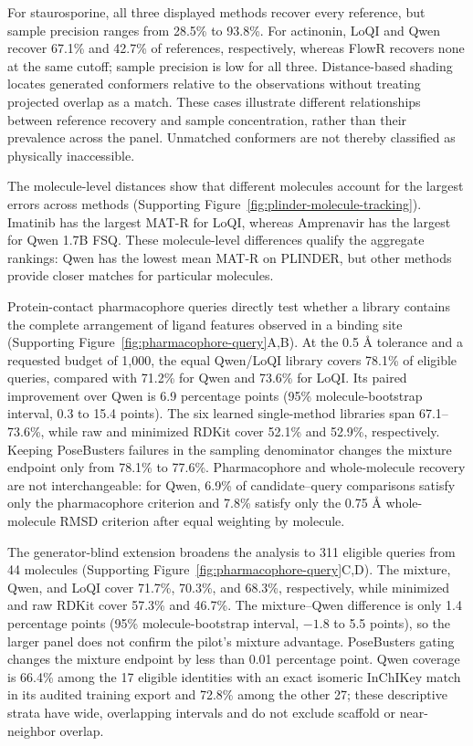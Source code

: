 For staurosporine, all three displayed methods recover every reference, but sample
precision ranges from 28.5\% to 93.8\%. For actinonin, LoQI and Qwen recover 67.1\%
and 42.7\% of references, respectively, whereas FlowR recovers none at the same cutoff;
sample precision is low for all three. Distance-based shading locates generated conformers
relative to the observations without treating projected overlap as a match. These cases
illustrate different relationships between reference recovery and sample concentration,
rather than their prevalence across the panel. Unmatched conformers are not thereby
classified as physically inaccessible.

\conformerlandscapefigure

The molecule-level distances show that different molecules account for the largest
errors across methods (Supporting Figure~\ref{fig:plinder-molecule-tracking}). Imatinib has the
largest MAT-R for LoQI, whereas Amprenavir has the largest for Qwen 1.7B FSQ.
These molecule-level differences qualify the aggregate rankings: Qwen has the lowest
mean MAT-R on PLINDER, but other methods provide closer matches for particular molecules.

Protein-contact pharmacophore queries directly test whether a library
contains the complete arrangement of ligand features observed in a binding site
(Supporting Figure~\ref{fig:pharmacophore-query}A,B). At the 0.5 \AA{} tolerance and
a requested budget of 1,000, the equal Qwen/LoQI library covers 78.1\% of eligible
queries, compared with 71.2\% for Qwen and 73.6\% for LoQI. Its paired improvement
over Qwen is 6.9 percentage points (95\% molecule-bootstrap interval, 0.3 to 15.4
points). The six learned single-method libraries span 67.1--73.6\%, while raw and
minimized RDKit cover 52.1\% and 52.9\%, respectively. Keeping PoseBusters failures
in the sampling denominator changes the mixture endpoint only from 78.1\% to 77.6\%.
Pharmacophore and whole-molecule recovery are not interchangeable: for Qwen, 6.9\%
of candidate--query comparisons satisfy only the pharmacophore criterion and 7.8\%
satisfy only the 0.75 \AA{} whole-molecule RMSD criterion after equal weighting by
molecule.

The generator-blind extension broadens the analysis to 311 eligible queries from
44 molecules (Supporting Figure~\ref{fig:pharmacophore-query}C,D). The mixture,
Qwen, and LoQI cover 71.7\%, 70.3\%, and 68.3\%, respectively, while minimized and
raw RDKit cover 57.3\% and 46.7\%. The mixture--Qwen difference is only 1.4
percentage points (95\% molecule-bootstrap interval, $-1.8$ to 5.5 points), so the
larger panel does not confirm the pilot's mixture advantage. PoseBusters gating
changes the mixture endpoint by less than 0.01 percentage point. Qwen coverage is
66.4\% among the 17 eligible identities with an exact isomeric InChIKey match in
its audited training export and 72.8\% among the other 27; these descriptive strata
have wide, overlapping intervals and do not exclude scaffold or near-neighbor
overlap.

